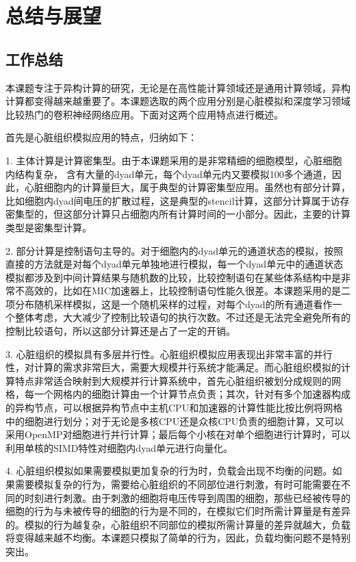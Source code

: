 \chapter{总结与展望}
\section{工作总结}
本课题专注于异构计算的研究，无论是在高性能计算领域还是通用计算领域，异构计算都变得越来越重要了。本课题选取的两个应用分别是心脏模拟和深度学习领域比较热门的卷积神经网络应用。下面对这两个应用特点进行概述。

首先是心脏组织模拟应用的特点，归纳如下：

\begin{compactitem}
\item[1.]
主体计算是计算密集型。由于本课题采用的是非常精细的细胞模型，心脏细胞内结构复杂， 含有大量的dyad单元，每个dyad单元内又要模拟100多个通道，因此，心脏细胞内的计算量巨大，属于典型的计算密集型应用。虽然也有部分计算，比如细胞内dyad间电压的扩散过程，这是典型的stencil计算，这部分计算属于访存密集型的，但这部分计算只占细胞内所有计算时间的一小部分。因此，主要的计算类型是密集型计算。

\item[2.]
部分计算是控制语句主导的。对于细胞内的dyad单元的通道状态的模拟，按照直接的方法就是对每个dyad单元单独地进行模拟，每一个dyad单元中的通道状态模拟都涉及到中间计算结果与随机数的比较，比较控制语句在某些体系结构中是非常不高效的，比如在MIC加速器上，比较控制语句性能久很差。本课题采用的是二项分布随机采样模拟，这是一个随机采样的过程，对每个dyad的所有通道看作一个整体考虑，大大减少了控制比较语句的执行次数。不过还是无法完全避免所有的控制比较语句，所以这部分计算还是占了一定的开销。

\item[3.]
心脏组织的模拟具有多层并行性。心脏组织模拟应用表现出非常丰富的并行性，对计算的需求非常巨大，需要大规模并行系统才能满足。而心脏组织模拟的计算特点非常适合映射到大规模并行计算系统中，首先心脏组织被划分成规则的网格，每一个网格内的细胞计算由一个计算节点负责；其次，针对有多个加速器构成的异构节点，可以根据异构节点中主机CPU和加速器的计算性能比按比例将网格中的细胞进行划分；对于无论是多核CPU还是众核CPU负责的细胞计算，又可以采用OpenMP对细胞进行并行计算；最后每个小核在对单个细胞进行计算时，可以利用单核的SIMD特性对细胞内dyad单元进行向量化。

\item[4.]
心脏组织模拟如果需要模拟更加复杂的行为时，负载会出现不均衡的问题。如果需要模拟复杂的行为，需要给心脏组织的不同部位进行刺激，有时可能需要在不同的时刻进行刺激。由于刺激的细胞将电压传导到周围的细胞，那些已经被传导的细胞的行为与未被传导的细胞的行为是不同的，在模拟它们时所需计算量是有差异的。模拟的行为越复杂，心脏组织不同部位的模拟所需计算量的差异就越大，负载将变得越来越不均衡。本课题只模拟了简单的行为，因此，负载均衡问题不是特别突出。


\end{compactitem}
